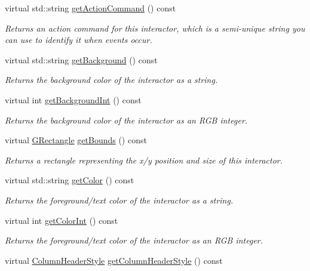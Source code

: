 \begin{DoxyCompactItemize}
virtual std\+::string \mbox{\hyperlink{classGInteractor_a94eb4276000c4fdfb508ce9e6317a82a}{get\+Action\+Command}} () const
\begin{DoxyCompactList}\small\item\em Returns an action command for this interactor, which is a semi-\/unique string you can use to identify it when events occur. \end{DoxyCompactList}\item 
virtual std\+::string \mbox{\hyperlink{classGInteractor_a808e22cc1fdfbecf71ed8c64ef4600e0}{get\+Background}} () const
\begin{DoxyCompactList}\small\item\em Returns the background color of the interactor as a string. \end{DoxyCompactList}\item 
virtual int \mbox{\hyperlink{classGInteractor_a9e827257a55cb8cf4d9de2ec6bcfd7a0}{get\+Background\+Int}} () const
\begin{DoxyCompactList}\small\item\em Returns the background color of the interactor as an R\+GB integer. \end{DoxyCompactList}\item 
virtual \mbox{\hyperlink{classGRectangle}{G\+Rectangle}} \mbox{\hyperlink{classGInteractor_a29e6ac35a0b48f491a4c88194cc5da3b}{get\+Bounds}} () const
\begin{DoxyCompactList}\small\item\em Returns a rectangle representing the x/y position and size of this interactor. \end{DoxyCompactList}\item 
virtual std\+::string \mbox{\hyperlink{classGInteractor_aa061dfa488c31e18549d64363c1d0e34}{get\+Color}} () const
\begin{DoxyCompactList}\small\item\em Returns the foreground/text color of the interactor as a string. \end{DoxyCompactList}\item 
virtual int \mbox{\hyperlink{classGInteractor_a9635c7af766cdc3417f346683fa0e6c1}{get\+Color\+Int}} () const
\begin{DoxyCompactList}\small\item\em Returns the foreground/text color of the interactor as an R\+GB integer. \end{DoxyCompactList}\item 
virtual \mbox{\hyperlink{classGTable_a060cff504451bbb98530e64e936e2671}{Column\+Header\+Style}} \mbox{\hyperlink{classGTable_a31ffc9e14dda3e91d1a1b3be81a42db8}{get\+Column\+Header\+Style}} () const

\end{DoxyCompactItemize}
